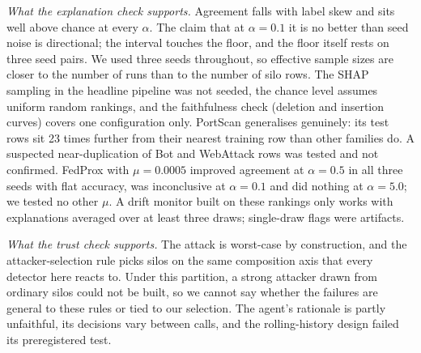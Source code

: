 \documentclass[conference]{IEEEtran}
\begin{document}
\emph{What the explanation check supports.} Agreement falls with label skew and sits
well above chance at every $\alpha$. The claim that at $\alpha=0.1$ it is no better than %
seed noise is directional; the interval touches the floor, and the floor itself rests on
three seed pairs. We used three seeds throughout, so effective sample sizes are closer to
the number of runs than to the number of silo rows. The SHAP sampling in the headline
pipeline was not seeded, the chance level assumes uniform random rankings, and the
faithfulness check (deletion and insertion curves) covers one configuration only. PortScan
generalises genuinely: its test rows sit 23 times further from their nearest training %
row than other families do. A suspected near-duplication of Bot and WebAttack rows was
tested and not confirmed. FedProx with $\mu=0.0005$ improved agreement at $\alpha=0.5$ in %
all three seeds with flat accuracy, was inconclusive at $\alpha=0.1$ and did nothing at %
$\alpha=5.0$; we tested no other $\mu$. A drift monitor built on these rankings only %
works with explanations averaged over at least three draws; single-draw flags were
artifacts.

\emph{What the trust check supports.} The attack is worst-case by construction, and the
attacker-selection rule picks silos on the same composition axis that every detector
here reacts to. Under this partition, a strong attacker drawn from ordinary silos could
not be built, so we cannot say whether the failures are general to these rules or tied
to our selection. The agent's rationale is partly unfaithful, its decisions vary
between calls, and the rolling-history design failed its preregistered test.

\end{document}
